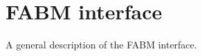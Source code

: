
\chapter{FABM interface \label{chap:interface}}

A general description of the FABM interface.

\clearpage



